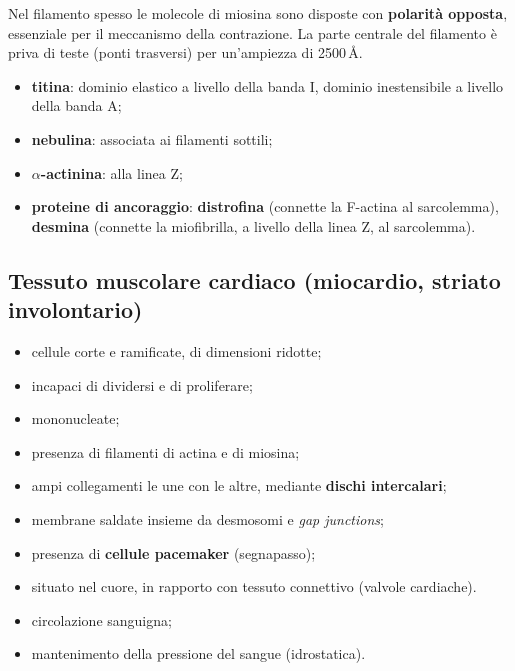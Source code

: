 Nel filamento spesso le molecole di miosina sono disposte con \textbf{polarità opposta}, essenziale per il meccanismo della contrazione. La parte centrale del filamento è priva di teste (ponti trasversi) per un'ampiezza di 2500\,\AA.

\begin{itemize}
  \item \textbf{titina}: dominio elastico a livello della banda I, dominio inestensibile a livello della banda A;
  \item \textbf{nebulina}: associata ai filamenti sottili;
  \item \textbf{$\alpha$-actinina}: alla linea Z;
  \item \textbf{proteine di ancoraggio}: \textbf{distrofina} (connette la F-actina al sarcolemma), \textbf{desmina} (connette la miofibrilla, a livello della linea Z, al sarcolemma).
\end{itemize}

\subsection{Tessuto muscolare cardiaco (miocardio, striato involontario)}

\begin{itemize}
  \item cellule corte e ramificate, di dimensioni ridotte;
  \item incapaci di dividersi e di proliferare;
  \item mononucleate;
  \item presenza di filamenti di actina e di miosina;
  \item ampi collegamenti le une con le altre, mediante \textbf{dischi intercalari};
  \item membrane saldate insieme da desmosomi e \textit{gap junctions};
  \item presenza di \textbf{cellule pacemaker} (segnapasso);
  \item situato nel cuore, in rapporto con tessuto connettivo (valvole cardiache).
\end{itemize}

\begin{itemize}
  \item circolazione sanguigna;
  \item mantenimento della pressione del sangue (idrostatica).
\end{itemize}

